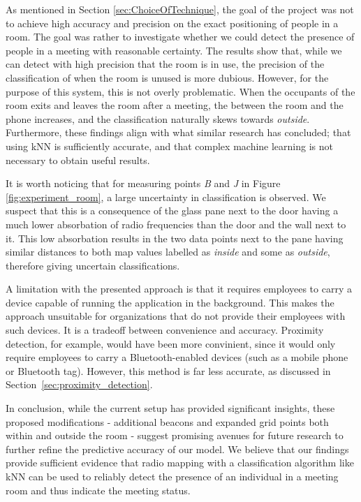 As mentioned in Section \ref{sec:ChoiceOfTechnique}, the goal of the project was not to achieve high accuracy and precision on the exact positioning of people in a room. 
The goal was rather to investigate whether we could detect the presence of people in a meeting with reasonable certainty.
The results show that, while we can detect with high precision that the room is in use, the precision of the classification of when the room is unused is more dubious. 
However, for the purpose of this system, this is not overly problematic. 
When the occupants of the room exits and leaves the room after a meeting, the between the room and the phone increases, and the classification naturally skews towards \textit{outside}.
Furthermore, these findings align with what similar research has concluded; that using kNN is sufficiently accurate, and that complex machine learning is not necessary to obtain useful results.\cite{ble_kneares_neural}

It is worth noticing that for measuring points \textit{B} and \textit{J} in Figure \ref{fig:experiment_room}, a large uncertainty in classification is observed.
We suspect that this is a consequence of the glass pane next to the door having a much lower absorbation of radio frequencies than the door and the wall next to it.
This low absorbation results in the two data points next to the pane having similar distances to both map values labelled as \textit{inside} and some as \textit{outside}, therefore giving uncertain classifications.

A limitation with the presented approach is that it requires employees to carry a device capable of running the application in the background.
This makes the approach unsuitable for organizations that do not provide their employees with such devices.
It is a tradeoff between convenience and accuracy.
Proximity detection, for example, would have been more convinient, since it would only require employees to carry a Bluetooth-enabled devices (such as a mobile phone or Bluetooth tag). However, this method is far less accurate, as discussed in Section~\ref{sec:proximity_detection}.


In conclusion, while the current setup has provided significant insights, these proposed modifications - additional beacons and expanded grid points both within and outside the room - suggest promising avenues for future research to further refine the predictive accuracy of our model.
We believe that our findings provide sufficient evidence that radio mapping with a classification algorithm like kNN can be used to reliably detect the presence of an individual in a meeting room and thus indicate the meeting status.